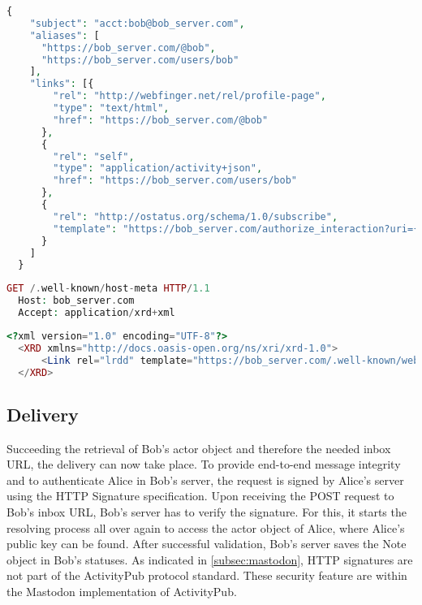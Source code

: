 \lstset{style=JSONStyle}
\begin{lstlisting}[language=PHP, caption=Webfinger response, label=fig:webfinger_response, float=h]
  {
    "subject": "acct:bob@bob_server.com",
    "aliases": [
      "https://bob_server.com/@bob",
      "https://bob_server.com/users/bob"
    ],
    "links": [{
        "rel": "http://webfinger.net/rel/profile-page",
        "type": "text/html",
        "href": "https://bob_server.com/@bob"
      },
      {
        "rel": "self",
        "type": "application/activity+json",
        "href": "https://bob_server.com/users/bob"
      },
      {
        "rel": "http://ostatus.org/schema/1.0/subscribe",
        "template": "https://bob_server.com/authorize_interaction?uri={uri}"
      }
    ]
  }
\end{lstlisting}

\begin{lstlisting}[language=PHP, caption=Hostmeta request, label=fig:hostmeta_request, float=h]
  GET /.well-known/host-meta HTTP/1.1
  Host: bob_server.com
  Accept: application/xrd+xml
\end{lstlisting}

\lstset{style=JSONStyle}
\begin{lstlisting}[language=PHP,caption=Hostmeta response, label=fig:hostmeta_response, float=h]
  <?xml version="1.0" encoding="UTF-8"?>
  <XRD xmlns="http://docs.oasis-open.org/ns/xri/xrd-1.0">
      <Link rel="lrdd" template="https://bob_server.com/.well-known/webfinger?resource={uri}"/>
  </XRD>
\end{lstlisting} 

\subsection{Delivery}
Succeeding the retrieval of Bob's actor object and therefore the needed inbox URL, the delivery can now take place. To provide end-to-end message integrity and to authenticate Alice in Bob's server, the request is signed by Alice's server using the HTTP Signature specification. Upon receiving the POST request to Bob's inbox URL, Bob's server has to verify the signature. For this, it starts the resolving process all over again to access the actor object of Alice, where Alice's public key can be found. After successful validation, Bob's server saves the Note object in Bob's statuses.
As indicated in \autoref{subsec:mastodon}, HTTP signatures are not part of the ActivityPub protocol standard. These security feature are within the Mastodon implementation of ActivityPub.

